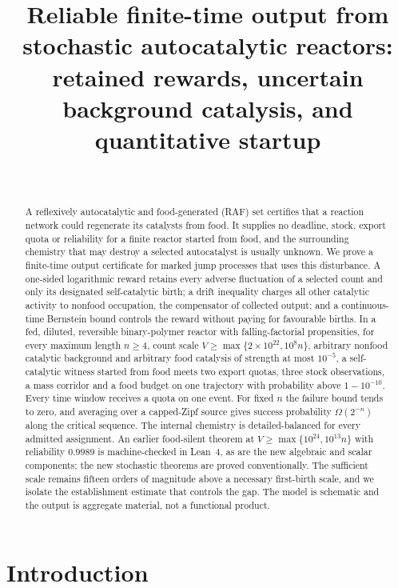 \documentclass[11pt,letterpaper]{article}
\title{Reliable finite-time output from\\ stochastic autocatalytic reactors:\\[4pt]
\large retained rewards, uncertain background catalysis, and quantitative startup}
\author{\PaperAuthor\\[2pt]\small\PaperAffiliation}
\date{\PaperDate}
\theoremstyle{plain}
\theoremstyle{definition}
\theoremstyle{remark}
\numberwithin{equation}{section}
\begin{document}
\maketitle

\begin{abstract}
A reflexively autocatalytic and food-generated (RAF) set certifies that a reaction network could regenerate its catalysts from food. It supplies no deadline, stock, export quota or reliability for a finite reactor started from food, and the surrounding chemistry that may destroy a selected autocatalyst is usually unknown. We prove a finite-time output certificate for marked jump processes that uses this disturbance. A one-sided logarithmic reward retains every adverse fluctuation of a selected count and only its designated self-catalytic birth; a drift inequality charges all other catalytic activity to nonfood occupation, the compensator of collected output; and a continuous-time Bernstein bound controls the reward without paying for favourable births. In a fed, diluted, reversible binary-polymer reactor with falling-factorial propensities, for every maximum length $n\ge4$, count scale $V\ge\max\{2\times10^{22},10^{8}n\}$, arbitrary nonfood catalytic background and arbitrary food catalysis of strength at most $10^{-5}$, a self-catalytic witness started from food meets two export quotas, three stock observations, a mass corridor and a food budget on one trajectory with probability above $1-10^{-10}$. Every time window receives a quota on one event. For fixed $n$ the failure bound tends to zero, and averaging over a capped-Zipf source gives success probability $\Omega(2^{-n})$ along the critical sequence. The internal chemistry is detailed-balanced for every admitted assignment. An earlier food-silent theorem at $V\ge\max\{10^{24},10^{13}n\}$ with reliability $0.9989$ is machine-checked in Lean~4, as are the new algebraic and scalar components; the new stochastic theorems are proved conventionally. The sufficient scale remains fifteen orders of magnitude above a necessary first-birth scale, and we isolate the establishment estimate that controls the gap. The model is schematic and the output is aggregate material, not a functional product.
\end{abstract}

\section{Introduction}\label{sec:intro}
\end{document}
